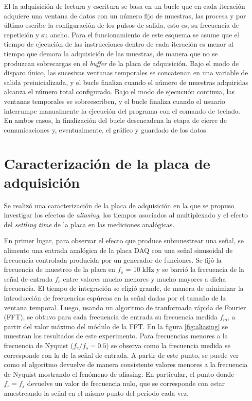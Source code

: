 \documentclass[a4paper,11pt]{article}
\begin{document}
	
	El la adquisición de lectura y escritura se basa en un bucle que en cada iteración adquiere una ventana de datos con un número fijo de muestras, las procesa y por último escribe la configuración de los pulsos de salida, esto es, su frecuencia de repetición y su ancho. Para el funcionamiento de este esquema se asume que el tiempo de ejecución de las instrucciones dentro de cada iteración es menor al tiempo que demora la adquisición de las muestras, de manera que no se produzcan sobrecargas en el \emph{buffer} de la placa de adquisición. Bajo el modo de disparo único, las sucesivas ventanas temporales se concatenan en una variable de salida preinicializada, y el bucle finaliza cuando el número de muestras adquiridas alcanza el número total configurado. Bajo el modo de ejecucuón continua, las ventanas temporales se sobreescriben, y el bucle finaliza cuando el usuario interrumpe manualmente la ejecución del programa con el comando de teclado. En ambos casos, la finalización del bucle desencadena la etapa de cierre de comunicaciones y, eventualmente, el gráfico y guardado de los datos.	

\section{Caracterización de la placa de adquisición}

Se realizó una caracterización de la placa de adquisición en la que se propuso investigar los efectos de \textit{aliasing}, los tiempos asociados al multiplexado y el efecto del \textit{settling time} de la placa en las mediciones analógicas. 

En primer lugar, para observar el efecto que produce submuestrear una señal, se alimento una entrada analógica de la placa DAQ con una señal sinusoidal de frecuencia controlada producida por un generador de funciones. Se fijó la frecuencia de muestreo de la placa en $f_s$ = 10 kHz y se barrió la frecuencia de la señal de entrada $f_r$ entre valores mucho menores y mucho mayores a dicha frecuencia. El tiempo de integración se eligió grande, de manera de minimizar la introducción de frecuencias espúreas en la señal dadas por el tamaño de la ventana temporal. Luego, usando un algoritmo de tranformada rápida de Fourier (FFT), se obtuvo para cada frecuencia de entrada su frecuencia medida $f_m$, a partir del valor máximo del módulo de la FFT. En la figura \ref{fig:aliasing} se muestran los resultados de este experimento. Para frecuencias menores a la frecuencia de Nyquist ($f_r/f_s = 0.5$) se observa como la frecuencia medida se corresponde con la de la señal de entrada. A partir de este punto, se puede ver como el algoritmo devuelve de manera consistente valores menores a la frecuencia de Nyquist mostrando el fenómeno de aliasing. En particular, el punto donde $f_r = f_s$ devuelve un valor de frecuencia nulo, que se corresponde con estar muestreando la señal en el mismo punto del período cada vez.
\end{document}
